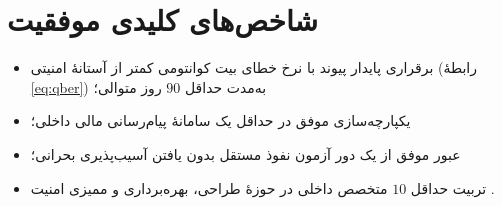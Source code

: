\section{شاخص‌های کلیدی موفقیت }

\begin{itemize}
\item برقراری پایدار پیوند  با نرخ خطای بیت کوانتومی کمتر از آستانهٔ امنیتی (رابطهٔ \ref{eq:qber}) به‌مدت حداقل $90$ روز متوالی؛
\item یکپارچه‌سازی موفق  در حداقل یک سامانهٔ پیام‌رسانی مالی داخلی؛
\item عبور موفق از یک دور آزمون نفوذ مستقل بدون یافتن آسیب‌پذیری بحرانی؛
\item تربیت حداقل $10$ متخصص داخلی در حوزهٔ طراحی، بهره‌برداری و ممیزی امنیت .
\end{itemize}

